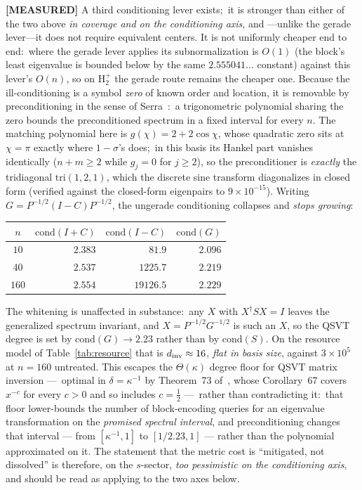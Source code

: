 \documentclass[aps,pra,twocolumn,superscriptaddress,longbibliography]{revtex4-2}
\begin{document}
\textbf{[MEASURED]} A third conditioning lever exists;\ it is stronger than
either of the two above \emph{in coverage and on the conditioning axis}, and
---unlike the gerade lever---it does not require equivalent centers.  It is not
uniformly cheaper end to end:\ where the gerade lever applies its
subnormalization is $O(1)$ (the block's least eigenvalue is bounded below by the
same $2.555041\ldots$ constant) against this lever's $O(n)$, so on
$\mathrm{H}_2^+$ the gerade route remains the cheaper one.  Because the ill-conditioning is a symbol \emph{zero} of
known order and location, it is removable by preconditioning in the sense of
Serra~\cite{serra1997}:\ a trigonometric polynomial sharing the zero bounds the
preconditioned spectrum in a fixed interval for every $n$.  The matching
polynomial here is $g(\chi)=2+2\cos\chi$, whose quadratic zero sits at
$\chi=\pi$ exactly where $1-\sigma$'s does;\ in this basis its Hankel part
vanishes identically ($n+m\ge2$ while $g_j=0$ for $j\ge2$), so the
preconditioner is \emph{exactly} the tridiagonal $\mathrm{tri}(1,2,1)$, which
the discrete sine transform diagonalizes in closed form (verified against the
closed-form eigenpairs to $9\times10^{-15}$).  Writing
$G=P^{-1/2}(I-C)P^{-1/2}$, the ungerade conditioning collapses and
\emph{stops growing}:
\begin{center}
\begin{tabular}{crrr}
\toprule
$n$ & $\mathrm{cond}(I+C)$ & $\mathrm{cond}(I-C)$ & $\mathrm{cond}(G)$\\
\midrule
$10$  & $2.383$ & $81.9$    & $2.096$\\
$40$  & $2.537$ & $1225.7$  & $2.219$\\
$160$ & $2.554$ & $19126.5$ & $\mathbf{2.229}$\\
\bottomrule
\end{tabular}
\end{center}
The whitening is unaffected in substance:\ any $X$ with $X^\dagger SX=I$ leaves
the generalized spectrum invariant, and $X=P^{-1/2}G^{-1/2}$ is such an $X$, so
the QSVT degree is set by $\mathrm{cond}(G)\to2.23$ rather than by
$\mathrm{cond}(S)$.  On the resource model of Table~\ref{tab:resource} that is
$d_{\rm inv}\approx16$, \emph{flat in basis size}, against $3\times10^{5}$ at
$n=160$ untreated.  This escapes the $\Theta(\kappa)$ degree floor for QSVT matrix inversion
---\ optimal in $\delta=\kappa^{-1}$ by Theorem~73
of~\cite{gslw2019}, whose Corollary~67 covers $x^{-c}$ for every $c>0$ and so
includes $c=\tfrac12$ ---\ rather than contradicting it:\ that floor
lower-bounds the number of block-encoding queries for an eigenvalue
transformation on the \emph{promised spectral interval}, and preconditioning
changes that interval --- from $[\kappa^{-1},1]$ to $[1/2.23,1]$ --- rather
than the polynomial approximated on it.  The statement that the metric cost is ``mitigated, not
dissolved'' is therefore, on the $s$-sector, \emph{too pessimistic on the conditioning axis}, and
should be read as applying to the two axes below.
\end{document}
